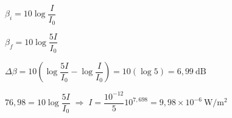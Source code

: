 \begin{solapartat}
 $\beta_i = 10\log\dfrac{I}{I_0}$

 $\beta_f = 10\log\dfrac{5I}{I_0}$

 $\Delta\beta = 10\left(\log\dfrac{5I}{I_0} - \log\dfrac{I}{I_0}\right) = 10(\log 5) = 6,99\ \mathrm{dB}$ 
\end{solapartat}

\begin{solapartat}
 $76,98 = 10\log\dfrac{5I}{I_0} \;\Rightarrow\; I = \dfrac{10^{-12}}{5}10^{7,698} = 9,98\times 10^{-6}\ \mathrm{W/m^2}$ 
\end{solapartat}
